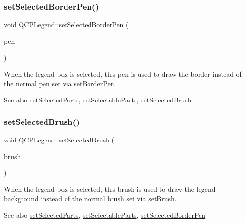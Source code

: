 \subsubsection{\texorpdfstring{set\+Selected\+Border\+Pen()}{setSelectedBorderPen()}}
{\footnotesize\ttfamily void Q\+C\+P\+Legend\+::set\+Selected\+Border\+Pen (\begin{DoxyParamCaption}\item[{const Q\+Pen \&}]{pen }\end{DoxyParamCaption})}

When the legend box is selected, this pen is used to draw the border instead of the normal pen set via \hyperlink{class_q_c_p_legend_a866a9e3f5267de7430a6c7f26a61db9f}{set\+Border\+Pen}.

\begin{DoxySeeAlso}{See also}
\hyperlink{class_q_c_p_legend_a2aee309bb5c2a794b1987f3fc97f8ad8}{set\+Selected\+Parts}, \hyperlink{class_q_c_p_legend_a9ce60aa8bbd89f62ae4fa83ac6c60110}{set\+Selectable\+Parts}, \hyperlink{class_q_c_p_legend_a875227f3219c9799464631dec5e8f1bd}{set\+Selected\+Brush} 
\end{DoxySeeAlso}
\hypertarget{class_q_c_p_legend_a875227f3219c9799464631dec5e8f1bd}{}\label{class_q_c_p_legend_a875227f3219c9799464631dec5e8f1bd} 
\subsubsection{\texorpdfstring{set\+Selected\+Brush()}{setSelectedBrush()}}
{\footnotesize\ttfamily void Q\+C\+P\+Legend\+::set\+Selected\+Brush (\begin{DoxyParamCaption}\item[{const Q\+Brush \&}]{brush }\end{DoxyParamCaption})}

When the legend box is selected, this brush is used to draw the legend background instead of the normal brush set via \hyperlink{class_q_c_p_legend_a497bbcd38baa3598c08e2b3f48103f23}{set\+Brush}.

\begin{DoxySeeAlso}{See also}
\hyperlink{class_q_c_p_legend_a2aee309bb5c2a794b1987f3fc97f8ad8}{set\+Selected\+Parts}, \hyperlink{class_q_c_p_legend_a9ce60aa8bbd89f62ae4fa83ac6c60110}{set\+Selectable\+Parts}, \hyperlink{class_q_c_p_legend_a2c35d262953a25d96b6112653fbefc88}{set\+Selected\+Border\+Pen} 
\end{DoxySeeAlso}
\hypertarget{class_q_c_p_legend_ab580a01c3c0a239374ed66c29edf5ad2}{}\label{class_q_c_p_legend_ab580a01c3c0a239374ed66c29edf5ad2} 
